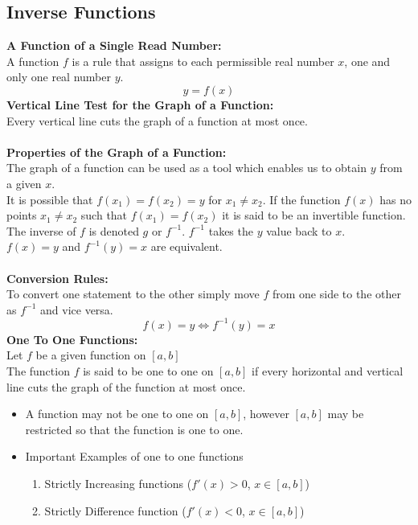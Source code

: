 \documentclass[14pt]{article}
\begin{document}
    \subsection{Inverse Functions}
    \textbf{A Function of a Single Read Number:}\\
    A function $f$ is a rule that assigns to each permissible real number $x$, one and only one real number $y$. $$y=f(x)$$
    \textbf{Vertical Line Test for the Graph of a Function:}\\
    Every vertical line cuts the graph of a function at most once.\\\\
    \textbf{Properties of the Graph of a Function:}\\
    The graph of a function can be used as a tool which enables us to obtain $y$ from a given $x$.\\
    It is possible that $f(x_1)=f(x_2)=y$ for $x_1\neq x_2$. If the function $f(x)$ has no points $x_1\neq x_2$ such that $f(x_1)=f(x_2)$ it is said to be an invertible function. 
    The inverse of $f$ is denoted $g$ or $f^{-1}$. $f^{-1}$ takes the $y$ value back to $x$.\\ 
    $f(x)=y$ and $f^{-1}(y)=x$ are equivalent.\\\\
    \textbf{Conversion Rules:}\\
    To convert one statement to the other simply move $f$ from one side to the other as $f^{-1}$ and vice versa.
    $$f(x)=y \Leftrightarrow f^{-1}(y)=x$$
    \textbf{One To One Functions:}\\
    Let $f$ be a given function on $[a,b]$\\
    The function $f$ is said to be one to one on $[a,b]$ if every horizontal and vertical line cuts the graph of the function at most once.
    \begin{itemize}
        \item A function may not be one to one on $[a,b]$, however $[a,b]$ may be restricted so that the function is one to one.
        \item Important Examples of one to one functions\begin{enumerate}
            \item Strictly Increasing functions ($f'(x)>0$, $x\in[a,b]$)
            \item Strictly Difference function ($f'(x)<0$, $x\in[a,b]$)
        \end{enumerate}
    \end{itemize}
\end{document}
